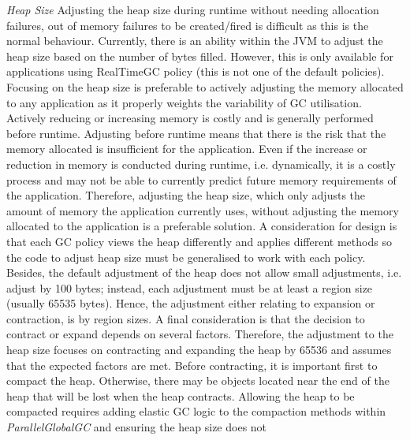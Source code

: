 \emph{Heap Size}
\newline\newline
Adjusting the heap size during runtime without needing allocation
failures, out of memory failures to be created/fired is difficult as
this is the normal behaviour. Currently, there is an ability within the
JVM to adjust the heap size based on the number of bytes filled.
However, this is only available for applications using RealTimeGC policy (this is not one of the default policies).
\newline\newline
Focusing on the heap size is preferable to actively adjusting the memory allocated to any application as it properly weights the variability of GC utilisation. Actively reducing or increasing memory is costly \cite{yang2004automatic} and is generally performed before runtime. Adjusting before runtime means that there is the risk that the memory allocated is insufficient for the application. Even if the increase or reduction in memory is conducted during runtime, i.e. dynamically, it is a costly process and may not be able to currently predict future memory requirements of the application. Therefore, adjusting the heap size, which only adjusts the amount of memory the application currently uses, without adjusting the memory allocated to the application is a preferable solution.
\newline\newline
A consideration for
design is that each GC policy views the heap differently and applies
different methods so the code to adjust heap size must be generalised to
work with each policy. Besides, the default adjustment of the heap does
not allow small adjustments, i.e. adjust by 100 bytes; instead, each
adjustment must be at least a region size (usually 65535 bytes). Hence,
the adjustment either relating to expansion or contraction, is by region
sizes. A final consideration is that the decision to contract or expand
depends on several factors. Therefore, the adjustment to the heap size
focuses on contracting and expanding the heap by 65536 and assumes that
the expected factors are met. 
\newline\newline
Before contracting, it is important first
to compact the heap. Otherwise, there may be objects located near the
end of the heap that will be lost when the heap contracts. Allowing the
heap to be compacted requires adding elastic GC logic to the compaction
methods within \emph{ParallelGlobalGC} and ensuring the heap size does not
